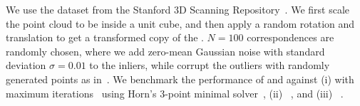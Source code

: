 We use the \bunny dataset from the Stanford 3D Scanning Repository~\cite{Curless96siggraph}. We first scale the \bunny point cloud to be inside a unit cube, and then  apply a random rotation and translation to get a transformed copy of the \bunny. $N=100$ correspondences are randomly chosen, where we add zero-mean Gaussian noise with standard deviation $\sigma=0.01$ to the inliers, while corrupt the outliers with randomly generated points as in~\cite{Yang19rss-teaser}. We benchmark the performance of \GNCGM and \GNCTLS against (i) \ransac with  maximum iterations~ using Horn's 3-point minimal solver~\cite{Horn87josa}, (ii) \adapt~\cite{Tzoumas19iros-outliers}, and (iii) \TEASER~\cite{Yang19rss-teaser}. %

